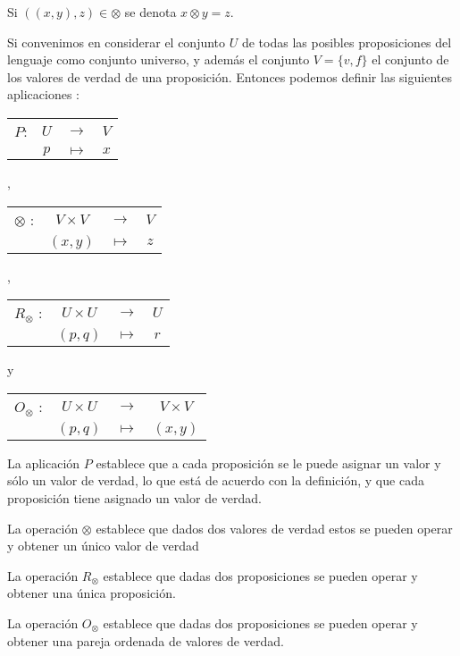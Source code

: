 \notacion Si $\left(\left(x,y\right),z\right)\in\otimes$ se denota
$x\otimes y=z.$

Si convenimos en considerar el conjunto $U$ de todas las posibles
proposiciones del lenguaje como conjunto universo, y además el conjunto
$V=\{v,f\}$ el conjunto de los valores de verdad de una proposición.
Entonces podemos definir las siguientes aplicaciones :

\begin{center} %
\begin{tabular}{cccc}
$P$: & $U$ & $\rightarrow$ & $V$\tabularnewline
 & $p$ & $\mapsto$ & $x$\tabularnewline
\end{tabular}, %
\begin{tabular}{cccc}
$\otimes$ : & $V\times V$ & $\rightarrow$ & %
$V$%
\tabularnewline
 & $\left(x,y\right)$ & $\mapsto$ & $z$\tabularnewline
\end{tabular}, %
\begin{tabular}{cccc}
$R_{\otimes}$ : & $U\times U$ & $\rightarrow$ & %
$U$%
\tabularnewline
 & $\left(p,q\right)$ & $\mapsto$ & $r$\tabularnewline
\end{tabular}y %
\begin{tabular}{cccc}
$O_{\otimes}$ : & $U\times U$ & $\rightarrow$ & %
$V\times V$%
\tabularnewline
 & $\left(p,q\right)$ & $\mapsto$ & $(x,y)$\tabularnewline
\end{tabular}\end{center}

\begin{lista}

\item La aplicación $P$ establece que a cada proposición se le puede
asignar un valor y sólo un valor de verdad, lo que está de acuerdo
con la definición, y que cada proposición tiene asignado un valor
de verdad.

\item La operación $\otimes$ establece que dados dos valores de
verdad estos se pueden operar y obtener un único valor de verdad

\item La operación $R_{\otimes}$ establece que dadas dos proposiciones
se pueden operar y obtener una única proposición.

\item La operación $O_{\otimes}$ establece que dadas dos proposiciones
se pueden operar y obtener una pareja ordenada de valores de verdad.

\end{lista}

